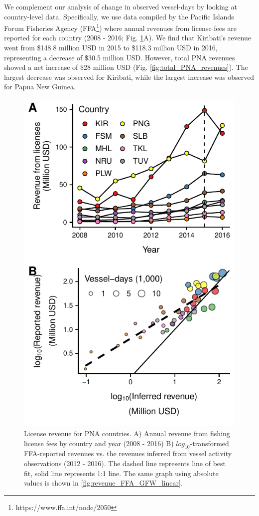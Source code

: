 \documentclass[9p,twocolumn,twoside,lineno]{pnas-new}
\begin{document}
We complement our analysis of change in observed vessel-days by looking at country-level data. Specifically, we use data compiled by the Pacific Islands Forum Fisheries Agency (FFA\footnote{https://www.ffa.int/node/2050}) where annual revenues from license fees are reported for each country (2008 - 2016; Fig. \ref{fig:revenues}A). We find that Kiribati's revenue went from \$148.8 million USD in 2015 to \$118.3 million USD in 2016, representing a decrease of \$30.5 million USD. However, total PNA revenues showed a net increase of \$28 million USD (Fig. \ref{fig:total_PNA_revenues}). The largest decrease was observed for Kiribati, while the largest increase was observed for Papua New Guinea.

\begin{figure}[ht]
\centering
	\includegraphics{img/revenues.pdf}
	\caption{\label{fig:revenues}
		License revenue for PNA countries. A) Annual revenue from fishing license fees by country and year (2008 - 2016) B) $log_{10}$-transformed FFA-reported revenues vs. the revenues inferred from vessel activity observations (2012 - 2016). The dashed line represents line of best fit, solid line represents 1:1 line. The same graph using absolute values is shown in \ref{fig:revenue_FFA_GFW_linear}.}
\end{figure}
\end{document}
